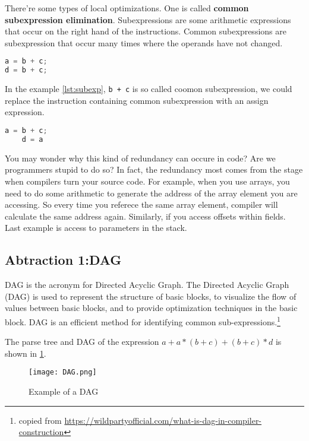 There're some types of local optimizations. 
One is called \textbf{common subexpression elimination}. Subexpressions are some arithmetic expressions that occur on the
 right hand of the instructions. Common subexpressions are subexpression that occur many times where the operands have not 
 changed.
 
\begin{lstlisting}[language=C, frame=single,caption=Subexpression example,label=lst:subexp]
a = b + c;
d = b + c;
\end{lstlisting}

In the example \ref{lst:subexp}, \texttt{b + c} is so called coomon subexpression, we could replace the instruction containing 
common subexpression with an assign expression. 


\begin{lstlisting}[language=C, frame=single,caption=code snippet applied common subexpression elimination to \ref{lst:subexp},label=lst:transsubexpr]
    a = b + c;
    d = a
\end{lstlisting}

You may wonder why this kind of redundancy can occure in code? Are we programmers stupid to do so? In fact, 
the redundancy most comes from the stage when compilers  turn your source code. For example, when you use arrays,
you need to do some arithmetic to generate the address of the array element you are accessing. So every time you referece the same
array element, compiler will calculate the same address again. Similarly, if you access offsets within fields. Last example is 
access to parameters in the stack. 


\subsection{Abtraction 1:DAG}

DAG is the acronym for Directed Acyclic Graph. The Directed Acyclic Graph (DAG) is used to represent the 
structure of basic blocks, to visualize the flow of values between basic blocks, and to provide 
optimization techniques in the basic block. DAG is an efficient method for identifying common 
sub-expressions.\footnote{copied from \url{https://wildpartyofficial.com/what-is-dag-in-compiler-construction}}



The parse tree and DAG of the expression \(a + a*(b+c) + (b+c) *d \) is shown in \ref{fig:DAG}.


\begin{figure}[h]
    \centering
    \texttt{[image: DAG.png]}
    \caption{Example of a DAG}
    \label{fig:DAG}
\end{figure}



